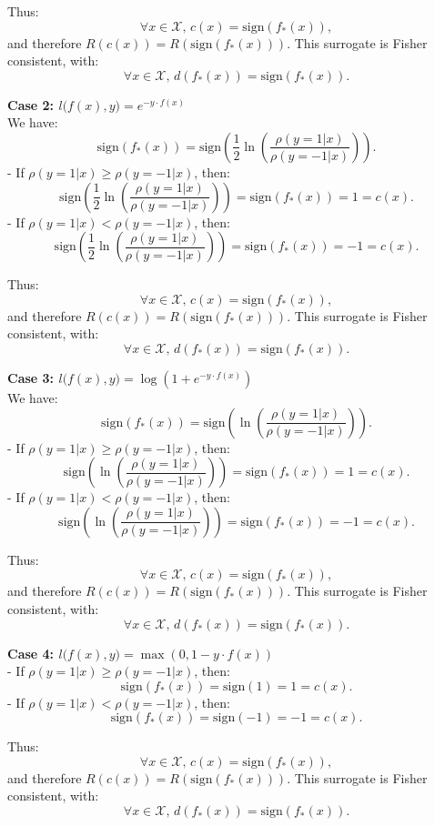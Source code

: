 \documentclass[final,3p,times,12pt]{article}
\begin{document}
Thus:
\[
\forall x \in \mathcal{X}, \, c(x) = \mathrm{sign}(f_*(x)),
\]
and therefore \(R(c(x)) = R(\mathrm{sign}(f_*(x)))\). This surrogate is Fisher consistent, with:
\[
\forall x \in \mathcal{X}, \, d(f_*(x)) = \mathrm{sign}(f_*(x)).
\]

\textbf{Case 2: \(l\big(f(x),y\big) = e^{-y \cdot f(x)}\)}\\
We have:
\[
\mathrm{sign}(f_*(x)) = \mathrm{sign}\left(\frac{1}{2} \ln\left(\frac{\rho(y=1|x)}{\rho(y=-1|x)}\right)\right).
\]
- If \(\rho(y=1|x) \geq \rho(y=-1|x)\), then:
  \[
  \mathrm{sign}\left(\frac{1}{2} \ln\left(\frac{\rho(y=1|x)}{\rho(y=-1|x)}\right)\right) = \mathrm{sign}(f_*(x)) = 1 = c(x).
  \]
- If \(\rho(y=1|x) < \rho(y=-1|x)\), then:
  \[
  \mathrm{sign}\left(\frac{1}{2} \ln\left(\frac{\rho(y=1|x)}{\rho(y=-1|x)}\right)\right) = \mathrm{sign}(f_*(x)) = -1 = c(x).
  \]

Thus:
\[
\forall x \in \mathcal{X}, \, c(x) = \mathrm{sign}(f_*(x)),
\]
and therefore \(R(c(x)) = R(\mathrm{sign}(f_*(x)))\). This surrogate is Fisher consistent, with:
\[
\forall x \in \mathcal{X}, \, d(f_*(x)) = \mathrm{sign}(f_*(x)).
\]

\textbf{Case 3: \(l\big(f(x),y\big) = \log(1 + e^{-y \cdot f(x)})\)}\\
We have:
\[
\mathrm{sign}(f_*(x)) = \mathrm{sign}\left(\ln\left(\frac{\rho(y=1|x)}{\rho(y=-1|x)}\right)\right).
\]
- If \(\rho(y=1|x) \geq \rho(y=-1|x)\), then:
  \[
  \mathrm{sign}\left(\ln\left(\frac{\rho(y=1|x)}{\rho(y=-1|x)}\right)\right) = \mathrm{sign}(f_*(x)) = 1 = c(x).
  \]
- If \(\rho(y=1|x) < \rho(y=-1|x)\), then:
  \[
  \mathrm{sign}\left(\ln\left(\frac{\rho(y=1|x)}{\rho(y=-1|x)}\right)\right) = \mathrm{sign}(f_*(x)) = -1 = c(x).
  \]

Thus:
\[
\forall x \in \mathcal{X}, \, c(x) = \mathrm{sign}(f_*(x)),
\]
and therefore \(R(c(x)) = R(\mathrm{sign}(f_*(x)))\). This surrogate is Fisher consistent, with:
\[
\forall x \in \mathcal{X}, \, d(f_*(x)) = \mathrm{sign}(f_*(x)).
\]

\textbf{Case 4: \(l\big(f(x),y\big) = \max(0, 1 - y \cdot f(x))\)}\\
- If \(\rho(y=1|x) \geq \rho(y=-1|x)\), then:
  \[
  \mathrm{sign}(f_*(x)) = \mathrm{sign}(1) = 1 = c(x).
  \]
- If \(\rho(y=1|x) < \rho(y=-1|x)\), then:
  \[
  \mathrm{sign}(f_*(x)) = \mathrm{sign}(-1) = -1 = c(x).
  \]

Thus:
\[
\forall x \in \mathcal{X}, \, c(x) = \mathrm{sign}(f_*(x)),
\]
and therefore \(R(c(x)) = R(\mathrm{sign}(f_*(x)))\). This surrogate is Fisher consistent, with:
\[
\forall x \in \mathcal{X}, \, d(f_*(x)) = \mathrm{sign}(f_*(x)).
\]
\end{document}
